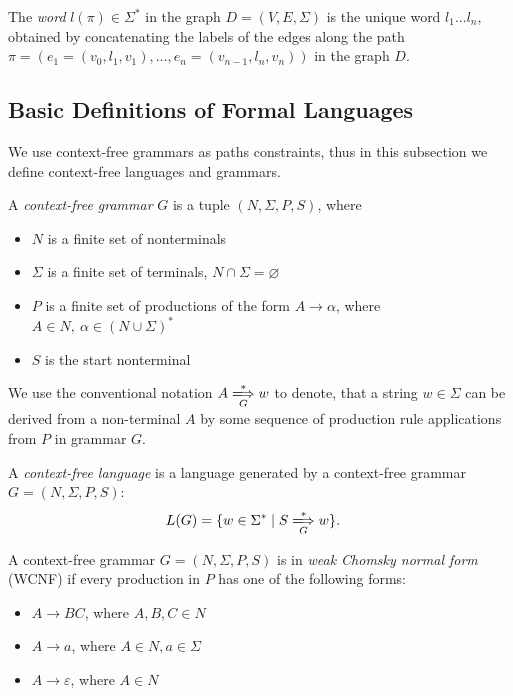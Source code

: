 \begin{definition}
	The \emph{word} $l(\pi) \in \Sigma^*$ in the graph $D=(V, E, \Sigma)$ is the unique word $l_1 ... l_n$, obtained by concatenating the labels of the edges along the	path $\pi = (e_1 = (v_0, l_1, v_1), \ldots, e_n = (v_{n-1}, l_n, v_n))$ in the graph $D$.
\end{definition}


\subsection{Basic Definitions of Formal Languages}
We use context-free grammars as paths constraints, thus in this subsection we define context-free languages and grammars.

\begin{definition}A \emph{context-free grammar} $G$ is a tuple $(N, \Sigma, P, S)$, where
\begin{itemize}
    \item $N$ is a finite set of nonterminals
    \item $\Sigma$ is a finite set of terminals, $N \cap \Sigma = \varnothing$
    \item $P$ is a finite set of productions of the form $A \to \alpha$, where $A \in N,\ \alpha \in (N \cup \Sigma)^*$
    \item $S$ is the start nonterminal
\end{itemize} 
\end{definition}

We use the conventional notation $A \xLongrightarrow[G]{*} w$ to denote, that a
string $w \in \Sigma$ can be derived from a non-terminal $A$ by some sequence of production rule applications from $P$ in grammar $G$.

\begin{definition} A \emph{context-free language} is a language generated by a context-free grammar $G=(N, \Sigma, P, S)$:
\begin{align*}
    L(G) &= \{w \in \Sigma^* \mid S \xLongrightarrow[G]{*} w \}.
\end{align*}
\end{definition}

\begin{definition} A context-free grammar $G = (N, \Sigma, P, S)$ is in \emph{weak Chomsky normal form} (WCNF) if every production in $P$ has one of the following forms:
    \begin{itemize}
        \item $A \rightarrow BC$, where $A, B, C \in N$
        \item  $A \rightarrow a$, where $A \in N, a \in \Sigma$
        \item $A \rightarrow \varepsilon$, where $A \in N$
    \end{itemize}
\end{definition}


